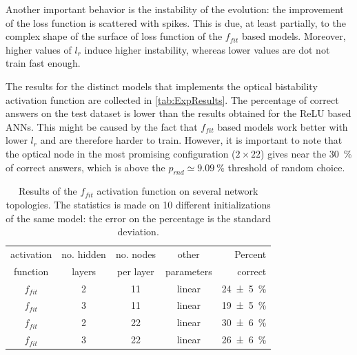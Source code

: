 Another important behavior is the instability of the evolution: the improvement of the loss function is scattered with spikes.
This is due, at least partially, to the complex shape of the surface of loss function of the $f_{fit}$ based models.
Moreover, higher values of $l_r$ induce higher instability, whereas lower values are dot not train fast enough.

The results for the distinct models that implements the optical bistability activation function are collected in \autoref{tab:ExpResults}.
The percentage of correct answers on the test dataset is lower than the results obtained for the \ac{ReLU} based \acp{ANN}.
This might be caused by the fact that $f_{fit}$ based models work better with lower $l_r$ and are therefore harder to train.
However, it is important to note that the optical node in the most promising configuration ($2\times 22$) gives near the \SI{30}{\percent} of correct answers, which is above the $p_{rnd}\simeq\SI{9.09}{\percent}$ threshold of random choice.

\begin{table}[htbp]
	\centering
	\begin{tabular}{c c c c r}
	\toprule
	activation	& no. hidden 	& no. nodes	& other			& Percent\\
	function		& layers 			& per layer	& parameters	& correct\\
	\midrule	
	$f_{fit}$ 			& 2 & 11 & linear & \SI{24 +- 5}{\percent} \\
	$f_{fit}$ 			& 3 & 11 & linear & \SI{19 +- 5}{\percent} \\
	$f_{fit}$ 			& 2 & 22 & linear & \SI{30 +- 6}{\percent} \\
	$f_{fit}$ 			& 3 & 22 & linear & \SI{26 +- 6}{\percent} \\
	\bottomrule
	\end{tabular}
	\caption{
		Results of the $f_{fit}$ activation function on several network topologies.
		The statistics is made on 10 different initializations of the same model:
		the error on the percentage is the standard deviation.	
	}
	\label{tab:ExpResults}
\end{table}
